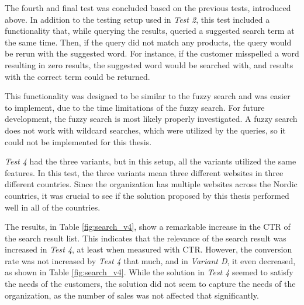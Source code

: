 
The fourth and final test was concluded based on the previous tests, introduced above.
In addition to the testing setup used in \emph{Test 2}, this test included a functionality that, while 
querying the results, queried a suggested search term at the same time.
Then, if the query did not match any products, the query would be rerun with the suggested word.
For instance, if the customer misspelled a word resulting in zero results,
the suggested word would be searched with, and results with the correct term could be returned.


This functionality was designed to be similar to the fuzzy search and was easier to implement,
due to the time limitations of the fuzzy search.
For future development, the fuzzy search is most likely properly investigated.
A fuzzy search does not work with wildcard searches, 
which were utilized by the queries, so it could not be implemented for this thesis.

\emph{Test 4} had the three variants, but in this setup, all the variants utilized the same features.
In this test, the three variants mean three different websites in three different countries.
Since the organization has multiple websites across the Nordic countries, it was crucial
to see if the solution proposed by this thesis performed well in all of the countries.


The results, in Table \ref{fig:search_v4}, show a remarkable increase in the CTR of the search result list.
This indicates that the relevance of the search result was increased in \emph{Test 4}, at least when
measured with CTR.
However, the conversion rate was not increased by \emph{Test 4} that much, and in \emph{Variant D}, it even decreased,
as shown in Table \ref{fig:search_v4}.
While the solution in \emph{Test 4} seemed to satisfy the needs of the customers, the solution did
not seem to capture the needs of the organization, as the number of sales was not affected that significantly.


